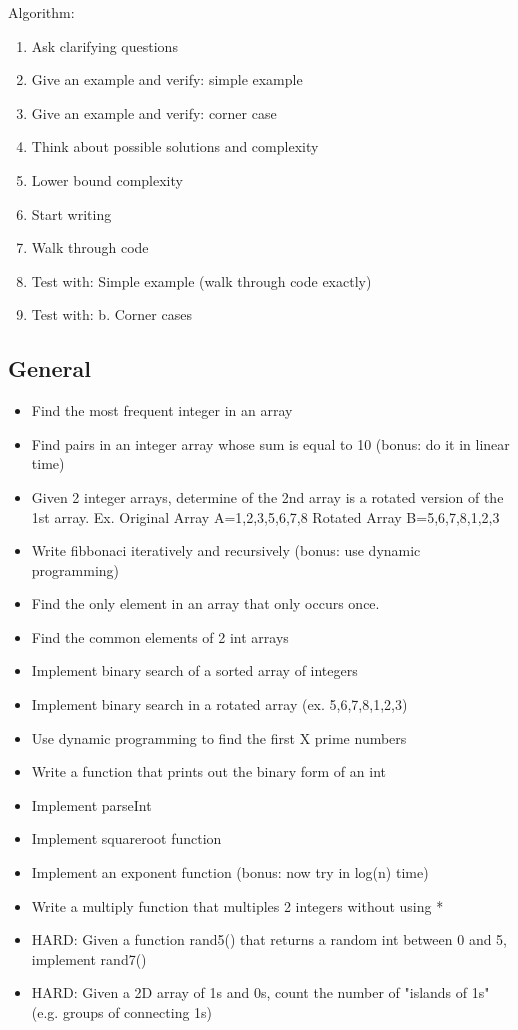 Algorithm:
\begin{enumerate}
\item Ask clarifying questions
\item Give an example and verify: simple example
\item Give an example and verify: corner case
\item Think about possible solutions and complexity
\item Lower bound complexity
\item Start writing
\item Walk through code
\item Test with: Simple example (walk through code exactly)
\item Test with: b. Corner cases
\end{enumerate}

\subsection{General}
\begin{itemize}
\item Find the most frequent integer in an array
\item Find pairs in an integer array whose sum is equal to 10 (bonus: do it in linear time)
\item Given 2 integer arrays, determine of the 2nd array is a rotated version of the 1st array. Ex. Original Array A={1,2,3,5,6,7,8} Rotated Array B={5,6,7,8,1,2,3}
\item Write fibbonaci iteratively and recursively (bonus: use dynamic programming)
\item Find the only element in an array that only occurs once.
\item Find the common elements of 2 int arrays
\item Implement binary search of a sorted array of integers
\item Implement binary search in a rotated array (ex. {5,6,7,8,1,2,3})
\item Use dynamic programming to find the first X prime numbers
\item Write a function that prints out the binary form of an int
\item Implement parseInt
\item Implement squareroot function
\item Implement an exponent function (bonus: now try in log(n) time)
\item Write a multiply function that multiples 2 integers without using *
\item HARD: Given a function rand5() that returns a random int between 0 and 5, implement rand7()
\item HARD: Given a 2D array of 1s and 0s, count the number of "islands of 1s" (e.g. groups of connecting 1s)
\end{itemize}
